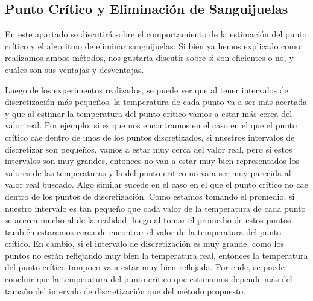 \documentclass[10pt, a4paper]{article}
\begin{document}
\subsection{Punto Cr\'itico y Eliminaci\'on de Sanguijuelas}
En este apartado se discutir\'a sobre el comportamiento de la estimaci\'on del punto cr\'itico y el algoritmo de eliminar sanguijuelas. Si bien ya hemos explicado como realizamos ambos m\'etodos, nos gustar\'ia discutir sobre si son eficientes o no, y cu\'ales son sus ventajas y desventajas.

Luego de los experimentos realizados, se puede ver que al tener intervalos de discretizaci\'on m\'as pequeños, la temperatura de cada punto va a ser m\'as acertada y que al estimar la temperatura del punto cr\'itico vamos a estar m\'as cerca del valor real. Por ejemplo, si es que nos encontramos en el caso en el que el punto cr\'itico cae dentro de unos de los puntos discretizados, si nuestros intervalos de discretizar son pequeños, vamos a estar muy cerca del valor real, pero si estos intervalos son muy grandes, entonces no van a estar muy bien representados los valores de las temperaturas y la del punto cr\'itico no va a ser muy parecida al valor real buscado. Algo similar sucede en el caso en el que el punto cr\'itico no cae dentro de los puntos de discretizaci\'on. Como estamos tomando el promedio, si nuestro intervalo es tan pequeño que cada valor de la temperatura de cada punto se acerca mucho al de la realidad, luego al tomar el promedio de estos puntos tambi\'en estaremos cerca de encontrar el valor de la temperatura del punto cr\'itico. En cambio, si el intervalo de discretizaci\'on es muy grande, como los puntos no est\'an reflejando muy bien la temperatura real, entonces la temperatura del punto cr\'itico tampoco va a estar muy bien reflejada. Por ende, se puede concluir que la temperatura del punto cr\'itico que estimamos depende m\'as del tamaño del intervalo de discretizaci\'on que del m\'etodo propuesto. 
\end{document}
